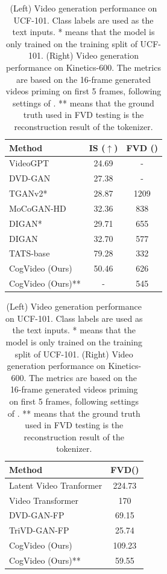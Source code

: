 \begin{table}
    \caption{(Left) Video generation performance on UCF-101. Class labels are used as the text inputs. * means that the model is only trained on the training split of UCF-101. (Right) Video generation performance on Kinetics-600. The metrics are based on the 16-frame generated videos priming on first 5 frames, following settings of  \citet{rakhimov2020latent}. ** means that the ground truth used in FVD testing is the reconstruction result of the tokenizer.}
  \label{tab:machine eval}
  \centering
  \begin{minipage}{0.47\columnwidth}
  \centering
  \begin{tabular}{lcc}
    \toprule
    Method & IS ($\uparrow$) & FVD ()\\
    \midrule
    VideoGPT\cite{yan2021videogpt}  &  24.69 & - \\
    DVD-GAN\cite{clark2019adversarial} & 27.38 & - \\
    TGANv2\cite{saito2020train}* & 28.87 & 1209 \\
    MoCoGAN-HD\cite{tian2021good} & 32.36 & 838  \\
    DIGAN\cite{yu2022generating}* & 29.71  & 655 \\
    DIGAN\cite{yu2022generating} & 32.70  & 577\\
    TATS-base\cite{ge2022long} & 79.28  & 332\\
    \midrule
    CogVideo (Ours) & 50.46  & 626\\
    CogVideo (Ours)** & - & 545 \\
    \bottomrule
  \end{tabular}
\end{minipage}
\begin{minipage}{0.47\columnwidth}
  \centering
  \begin{tabular}{lc}
    \toprule
    Method & FVD() \\
    \midrule
    Latent Video Tranformer\cite{rakhimov2020latent} & 224.73    \\
    Video Transformer\cite{weissenborn2019scaling}     & 170 \\
    DVD-GAN-FP\cite{clark2019adversarial}     & 69.15  \\
    TriVD-GAN-FP\cite{luc2020transformation}  & 25.74  \\
    \midrule
    CogVideo (Ours) & 109.23 \\
    CogVideo (Ours)** & 59.55 \\
    \bottomrule
  \end{tabular}
  \end{minipage}
\end{table}

